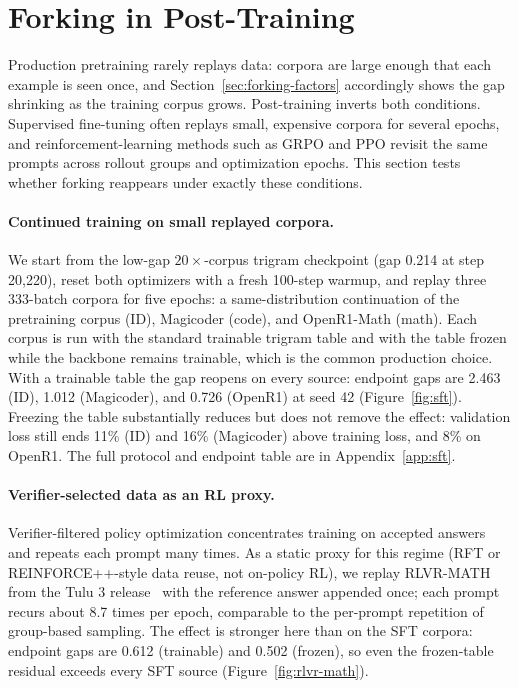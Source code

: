 \section{Forking in Post-Training}
\label{sec:transfer}

Production pretraining rarely replays data: corpora are large enough that each example is seen once, and Section~\ref{sec:forking-factors} accordingly shows the gap shrinking as the training corpus grows. Post-training inverts both conditions. Supervised fine-tuning often replays small, expensive corpora for several epochs, and reinforcement-learning methods such as GRPO and PPO revisit the same prompts across rollout groups and optimization epochs. This section tests whether forking reappears under exactly these conditions.

\paragraph{Continued training on small replayed corpora.}
We start from the low-gap $20\times$-corpus trigram checkpoint (gap 0.214 at step 20{,}220), reset both optimizers with a fresh 100-step warmup, and replay three 333-batch corpora for five epochs: a same-distribution continuation of the pretraining corpus (ID), Magicoder (code), and OpenR1-Math (math). Each corpus is run with the standard trainable trigram table and with the table frozen while the backbone remains trainable, which is the common production choice. With a trainable table the gap reopens on every source: endpoint gaps are 2.463 (ID), 1.012 (Magicoder), and 0.726 (OpenR1) at seed 42 (Figure~\ref{fig:sft}). Freezing the table substantially reduces but does not remove the effect: validation loss still ends 11\% (ID) and 16\% (Magicoder) above training loss, and 8\% on OpenR1. The full protocol and endpoint table are in Appendix~\ref{app:sft}.

\paragraph{Verifier-selected data as an RL proxy.}
Verifier-filtered policy optimization concentrates training on accepted answers and repeats each prompt many times. As a static proxy for this regime (RFT or REINFORCE++-style data reuse, not on-policy RL), we replay RLVR-MATH from the Tulu 3 release~\citep{lambert2024tulu3} with the reference answer appended once; each prompt recurs about 8.7 times per epoch, comparable to the per-prompt repetition of group-based sampling. The effect is stronger here than on the SFT corpora: endpoint gaps are 0.612 (trainable) and 0.502 (frozen), so even the frozen-table residual exceeds every SFT source (Figure~\ref{fig:rlvr-math}).

